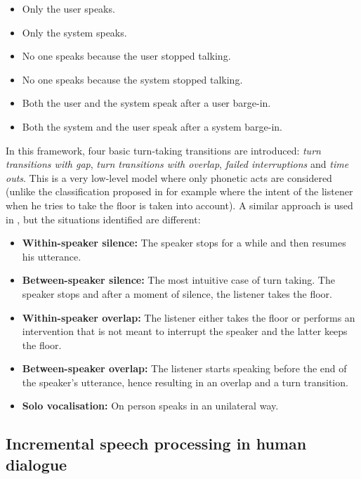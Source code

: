         \begin{itemize}
          \item Only the user speaks.
          \item Only the system speaks.
          \item No one speaks because the user stopped talking.
          \item No one speaks because the system stopped talking.
          \item Both the user and the system speak after a user barge-in.
          \item Both the system and the user speak after a system barge-in.
        \end{itemize}
        
        In this framework, four basic turn-taking transitions are introduced: \textit{turn transitions with gap}, \textit{turn transitions with overlap}, \textit{failed interruptions} and \textit{time outs}. This is a very low-level model where only phonetic acts are considered (unlike the classification proposed in \cite{Beattie1982} for example where the intent of the listener when he tries to take the floor is taken into account). A similar approach is used in \cite{Wlodarczak2013}, but the situations identified are different:

        \begin{itemize}
           \item \textbf{Within-speaker silence:} The speaker stops for a while and then resumes his utterance.
           \item \textbf{Between-speaker silence:} The most intuitive case of turn taking. The speaker stops and after a moment of silence, the listener takes the floor.
           \item \textbf{Within-speaker overlap:} The listener either takes the floor or performs an intervention that is not meant to interrupt the speaker and the latter keeps the floor.
           \item \textbf{Between-speaker overlap:} The listener starts speaking before the end of the speaker's utterance, hence resulting in an overlap and a turn transition.
           \item \textbf{Solo vocalisation:} On person speaks in an unilateral way.
        \end{itemize}
        
        \subsection{Incremental speech processing in human dialogue}
        \label{soa:inchuman}

